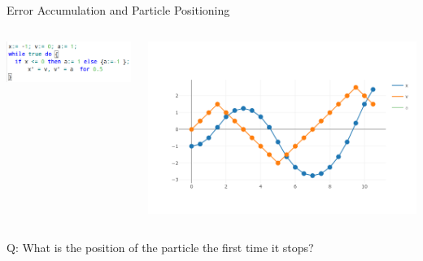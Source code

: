 \documentclass{beamer}
\begin{document}
\begin{frame}{Error Accumulation and Particle Positioning}
  \begin{minipage}[0.3\textheight]{\textwidth}
  \begin{columns}[c]
  \begin{column}{0.45\textwidth}
   \hspace{0.3cm}
   \includegraphics[scale=0.38]{./images/pp.png}
  \end{column}
  \begin{column}{1\textwidth}
    \includegraphics[scale=0.3]{./images/zlochness.png}
  \end{column}
  \end{columns}
  \end{minipage}

  \vspace{1cm}
  Q: What is the position of the particle the first time it stops?
\end{frame}
\end{document}
